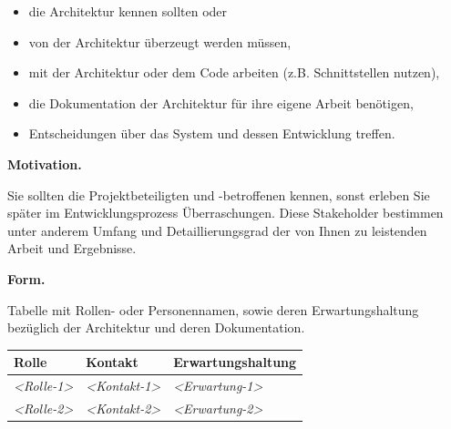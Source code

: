 \documentclass[]{article}
\begin{document}
\begin{itemize}
\item
  die Architektur kennen sollten oder
\item
  von der Architektur überzeugt werden müssen,
\item
  mit der Architektur oder dem Code arbeiten (z.B. Schnittstellen
  nutzen),
\item
  die Dokumentation der Architektur für ihre eigene Arbeit benötigen,
\item
  Entscheidungen über das System und dessen Entwicklung treffen.
\end{itemize}

\textbf{Motivation.}

Sie sollten die Projektbeteiligten und -betroffenen kennen, sonst
erleben Sie später im Entwicklungsprozess Überraschungen. Diese
Stakeholder bestimmen unter anderem Umfang und Detaillierungsgrad der
von Ihnen zu leistenden Arbeit und Ergebnisse.

\textbf{Form.}

Tabelle mit Rollen- oder Personennamen, sowie deren Erwartungshaltung
bezüglich der Architektur und deren Dokumentation.

\begin{longtable}[]{@{}lll@{}}
\toprule
\begin{minipage}[b]{0.23\columnwidth}\raggedright
Rolle\strut
\end{minipage} & \begin{minipage}[b]{0.23\columnwidth}\raggedright
Kontakt\strut
\end{minipage} & \begin{minipage}[b]{0.46\columnwidth}\raggedright
Erwartungshaltung\strut
\end{minipage}\tabularnewline
\midrule
\endhead
\begin{minipage}[t]{0.23\columnwidth}\raggedright
\emph{\textless{}Rolle-1\textgreater{}}\strut
\end{minipage} & \begin{minipage}[t]{0.23\columnwidth}\raggedright
\emph{\textless{}Kontakt-1\textgreater{}}\strut
\end{minipage} & \begin{minipage}[t]{0.46\columnwidth}\raggedright
\emph{\textless{}Erwartung-1\textgreater{}}\strut
\end{minipage}\tabularnewline
\begin{minipage}[t]{0.23\columnwidth}\raggedright
\emph{\textless{}Rolle-2\textgreater{}}\strut
\end{minipage} & \begin{minipage}[t]{0.23\columnwidth}\raggedright
\emph{\textless{}Kontakt-2\textgreater{}}\strut
\end{minipage} & \begin{minipage}[t]{0.46\columnwidth}\raggedright
\emph{\textless{}Erwartung-2\textgreater{}}\strut
\end{minipage}\tabularnewline
\bottomrule
\end{longtable}
\end{document}
